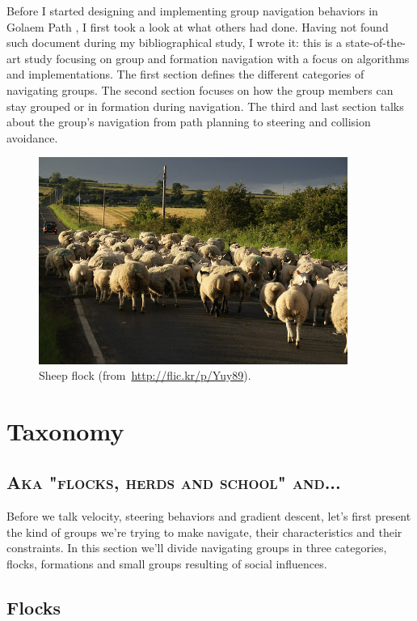 \documentclass[a4paper,titlepage]{article}
\newcommand{\sectionsubtitle}[1]{{\subsection*{\scshape #1}}}
\begin{document}
Before I started designing and implementing group navigation behaviors in Golaem Path \cite{GolaemPath:tw}, I first took a look at what others had done. Having not found such document during my bibliographical study, I wrote it: this is a state-of-the-art study focusing on group and formation navigation with a focus on algorithms and implementations. The first section defines the different categories of navigating groups. The second section focuses on how the group members can stay grouped or in formation during navigation. The third and last section talks about the group’s navigation from path planning to steering and collision avoidance.

\begin{figure}[h]
\centering
\includegraphics[width=0.9\textwidth]{SheepsHerd.jpg}
\caption{Sheep flock (from~\url{http://flic.kr/p/Yuy89}).}
\label{fig:sheep_flock}
\end{figure}

\section{Taxonomy}
\label{sec:taxonomy}
\sectionsubtitle{Aka "flocks, herds and school" and...}

Before we talk velocity, steering behaviors and gradient descent, let’s first present the kind of groups we’re trying to make navigate, their characteristics and their constraints. In this section we’ll divide navigating groups in three categories, flocks, formations and small groups resulting of social influences.

\subsection{Flocks}
\label{sec:taxonomy:flocks}
\end{document}
